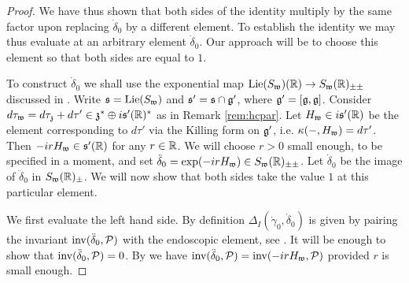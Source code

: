 \documentclass{article}
\theoremstyle{definition}
\numberwithin{equation}{section}
\renewcommand{\-}{\hyp{}}
\newcommand{\g}{\mathfrak g}
\begin{document}
\begin{proof}
We have thus shown that both sides of the identity multiply by the same factor upon replacing $\dot\delta_0$ by a different element. To establish the identity we may thus evaluate at an arbitrary element $\dot\delta_0$. Our approach will be to choose this element so that both sides are equal to $1$.

To construct $\dot\delta_0$ 
we shall use the exponential map $\textrm{Lie}(S_{\mathfrak{w}})(\mathbb{R}) \to S_{\mathfrak{w}}(\mathbb{R})_{\pm\pm}$ discussed in \cite[\S3.7]{KalDC}. Write $\mathfrak{s}=\textrm{Lie}(S_{\mathfrak{w}})$ and $\mathfrak{s}'=\mathfrak{s} \cap \mathfrak{g'}$, where $\mf{g}'=[\g,\g]$.  Consider $d\tau_{\mathfrak{w}} = d\tau_{\mathfrak{z}}+d\tau' \in \mathfrak{z}^* \oplus i\mathfrak{s}'(\mathbb{R})^*$ as in Remark \ref{rem:hcpar}. Let $H_{\mathfrak{w}} \in i\mathfrak{s}'(\mathbb{R})$ be the element corresponding to $d\tau'$ via the Killing form on $\mathfrak{g}'$, i.e. $\kappa(-,H_{\mathfrak{w}})=d\tau'$. Then $-irH_{\mathfrak{w}} \in \mathfrak{s}'(\mathbb{R})$ for any $r \in \mathbb{R}$. We will choose $r>0$ small enough, to be specified in a moment, and set $\ddot\delta_0=\exp(-irH_{\mathfrak{w}}) \in S_{\mathfrak{w}}(\mathbb{R})_{\pm\pm}$. Let $\dot\delta_0$ be the image of $\ddot\delta_0$ in $S_{\mathfrak{w}}(\mathbb{R})_{\pm}$. We will now show that both sides take the value $1$ at this particular element.

We first evaluate the left hand side. By definition $\Delta_{I}(\dot\gamma_0,\dot\delta_0)$ is given by pairing the invariant $\textrm{inv}(\ddot\delta_0,\mathcal{P})$ with the endoscopic element, see \cite[\S 4.1, \S4.3]{KalHDC}. It will be enough to show that $\textrm{inv}(\ddot\delta_0,\mathcal{P})=0$. By \cite[Lemma 4.1.4]{KalHDC} we have $\textrm{inv}(\ddot\delta_0,\mathcal{P})=\textrm{inv}(-irH_{\mathfrak{w}},\mathcal{P})$ provided $r$ is small enough.



\end{proof}
\end{document}
